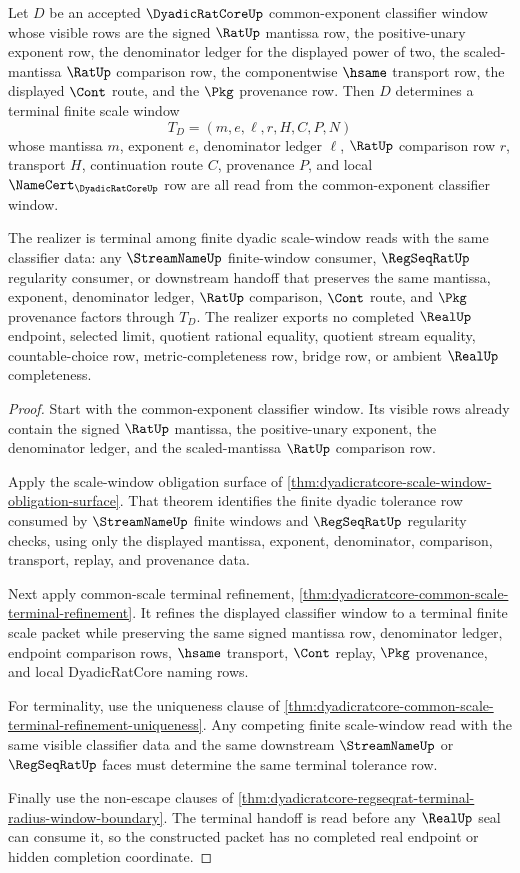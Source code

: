 \begin{theorem}
\label{thm:dyadicratcore-scale-window-realizer}
Let $D$ be an accepted $\DyadicRatCoreUp$ common-exponent classifier window whose visible rows are the signed $\RatUp$ mantissa row, the positive-unary exponent row, the denominator ledger for the displayed power of two, the scaled-mantissa $\RatUp$ comparison row, the componentwise $\hsame$ transport row, the displayed $\Cont$ route, and the $\Pkg$ provenance row. Then $D$ determines a terminal finite scale window
$$
T_D=(m,e,\ell,r,H,C,P,N)
$$
whose mantissa $m$, exponent $e$, denominator ledger $\ell$, $\RatUp$ comparison row $r$, transport $H$, continuation route $C$, provenance $P$, and local $\NameCert_{\DyadicRatCoreUp}$ row are all read from the common-exponent classifier window.

The realizer is terminal among finite dyadic scale-window reads with the same classifier data: any $\StreamNameUp$ finite-window consumer, $\RegSeqRatUp$ regularity consumer, or downstream handoff that preserves the same mantissa, exponent, denominator ledger, $\RatUp$ comparison, $\Cont$ route, and $\Pkg$ provenance factors through $T_D$. The realizer exports no completed $\RealUp$ endpoint, selected limit, quotient rational equality, quotient stream equality, countable-choice row, metric-completeness row, bridge row, or ambient $\RealUp$ completeness.
\end{theorem}
\begin{proof}
Start with the common-exponent classifier window. Its visible rows already contain the signed $\RatUp$ mantissa, the positive-unary exponent, the denominator ledger, and the scaled-mantissa $\RatUp$ comparison row.

Apply the scale-window obligation surface of \autoref{thm:dyadicratcore-scale-window-obligation-surface}. That theorem identifies the finite dyadic tolerance row consumed by $\StreamNameUp$ finite windows and $\RegSeqRatUp$ regularity checks, using only the displayed mantissa, exponent, denominator, comparison, transport, replay, and provenance data.

Next apply common-scale terminal refinement, \autoref{thm:dyadicratcore-common-scale-terminal-refinement}. It refines the displayed classifier window to a terminal finite scale packet while preserving the same signed mantissa row, denominator ledger, endpoint comparison rows, $\hsame$ transport, $\Cont$ replay, $\Pkg$ provenance, and local DyadicRatCore naming rows.

For terminality, use the uniqueness clause of \autoref{thm:dyadicratcore-common-scale-terminal-refinement-uniqueness}. Any competing finite scale-window read with the same visible classifier data and the same downstream $\StreamNameUp$ or $\RegSeqRatUp$ faces must determine the same terminal tolerance row.

Finally use the non-escape clauses of \autoref{thm:dyadicratcore-regseqrat-terminal-radius-window-boundary}. The terminal handoff is read before any $\RealUp$ seal can consume it, so the constructed packet has no completed real endpoint or hidden completion coordinate.
\end{proof}

